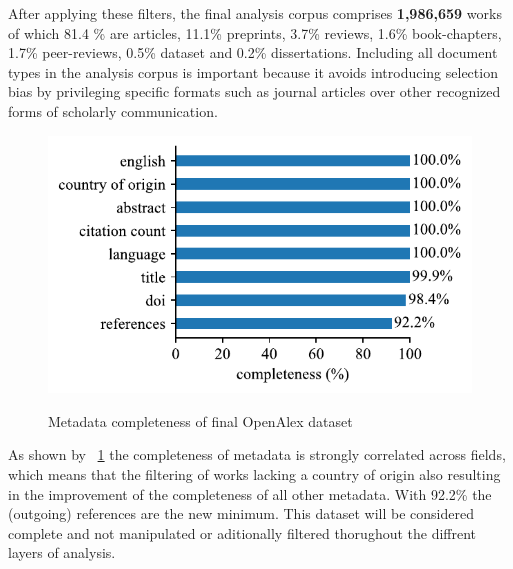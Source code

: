 \documentclass{article}
\begin{document}
After applying these filters, the final analysis corpus comprises \textbf{1{,}986{,}659} works of which 81.4 \% are articles, 11.1\% preprints, 3.7\% reviews, 1.6\% book-chapters, 1.7\% peer-reviews, 0.5\% dataset and 0.2\% dissertations. Including all document types in the analysis corpus is important because it avoids introducing selection bias by privileging specific formats such as journal articles over other recognized forms of scholarly communication.


\begin{figure}[H]
	\centering
	\caption{\textcolor{darkergray}{Metadata completeness of final OpenAlex dataset}} %
	\includegraphics[width=\columnwidth]{resources/working_dataset_completeness_bar_graph.pdf}
	\label{tab:metadata_completeness_wokring_dataset}
\end{figure}

As shown by \figurename~\ref{tab:metadata_completeness_wokring_dataset} the completeness of metadata is strongly correlated across fields, which means that the filtering of works lacking a country of origin also resulting in the improvement of the completeness of all other metadata. With 92.2\% the (outgoing) references are the new minimum. This dataset will be considered complete and not manipulated or aditionally filtered thorughout the diffrent layers of analysis. 
\end{document}
